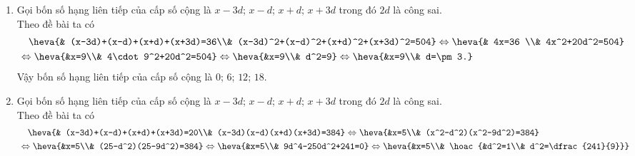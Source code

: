 \begin{bt}
{\begin{enumerate}
			Theo đề bài ta có 
			\begin{align*}
				&\quad \heva{& (x-3d)+(x-d)+(x+d)+(x+3d)=22\\& (x-3d)^2+(x-d)^2+(x+d)^2+(x+3d)^2=66}
				\Leftrightarrow \heva{& 4x=22 \\& 4x^2+20d^2=66}\\
				&\Leftrightarrow  \heva{&x=\dfrac{11}{2}\\& 4\cdot \left( \dfrac{11}{2}\right) ^2+20d^2=66}
				\Leftrightarrow  \heva{&x=\dfrac{11}{2}\\& d^2=\dfrac{-11}{4} 
					\ (\text{loại}).}\\
			\end{align*}
			Vậy không tồn tại bốn số hạng liên tiếp của cấp số cộng thỏa mãn yêu cầu đề bài.
			\item Gọi bốn số hạng liên tiếp của cấp số cộng là $x-3d$; $x-d$; $x+d$; $x+3d$ trong đó $2d$ là công sai.\\
			Theo đề bài ta có 
			\begin{align*}
				&\quad \heva{& (x-3d)+(x-d)+(x+d)+(x+3d)=36\\& (x-3d)^2+(x-d)^2+(x+d)^2+(x+3d)^2=504}
				\Leftrightarrow \heva{& 4x=36 \\& 4x^2+20d^2=504}\\
				&\Leftrightarrow  \heva{&x=9\\& 4\cdot 9^2+20d^2=504}
				\Leftrightarrow  \heva{&x=9\\& d^2=9}
				\Leftrightarrow  \heva{&x=9\\& d=\pm 3.}
			\end{align*}
			Vậy  bốn  số hạng liên tiếp của cấp số cộng là $0$; $ 6$; $ 12$; $18$.
			\item Gọi bốn số hạng liên tiếp của cấp số cộng là $x-3d$; $x-d$; $x+d$; $x+3d$ trong đó $2d$ là công sai.\\
			Theo đề bài ta có 
			\begin{align*}
				&\quad \heva{& (x-3d)+(x-d)+(x+d)+(x+3d)=20\\& (x-3d)(x-d)(x+d)(x+3d)=384}
				\Leftrightarrow  \heva{&x=5\\& (x^2-d^2)(x^2-9d^2)=384}\\
				&\Leftrightarrow  \heva{&x=5\\& (25-d^2)(25-9d^2)=384}
				\Leftrightarrow  \heva{&x=5\\& 9d^4-250d^2+241=0}
				\Leftrightarrow  \heva{&x=5\\& \hoac{&d^2=1\\& d^2=\dfrac{241}{9}}}

\end{align*}
\end{enumerate}}
\end{bt}
